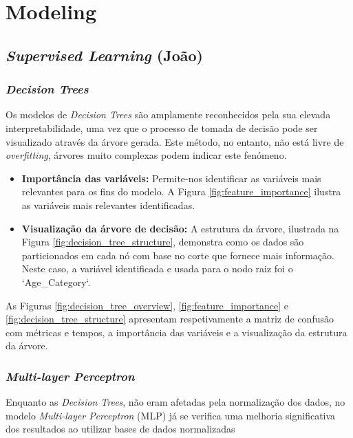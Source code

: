 \chapter{Modeling}
\label{chap4:modeling}


\section{\textit{Supervised Learning} (João)}
\label{chap4:super}

\subsection{\textit{Decision Trees}}
\label{chap4:decision_tree}

Os modelos de \textit{Decision Trees} são amplamente reconhecidos pela sua elevada interpretabilidade, uma vez que o processo de tomada de decisão pode ser visualizado através da árvore gerada. Este método, no entanto, não está livre de \textit{overfitting}, árvores muito complexas podem indicar este fenómeno.

\begin{itemize}
    \item \textbf{Importância das variáveis:} Permite-nos identificar as variáveis mais relevantes para os fins do modelo. A Figura \ref{fig:feature_importance} ilustra as variáveis mais relevantes identificadas.
    \item \textbf{Visualização da árvore de decisão:} A estrutura da árvore, ilustrada na Figura \ref{fig:decision_tree_structure}, demonstra como os dados são particionados em cada nó com base no corte que fornece mais informação. Neste caso, a variável identificada e usada para o nodo raiz foi o `Age\_Category`. 
\end{itemize}

As Figuras \ref{fig:decision_tree_overview}, \ref{fig:feature_importance} e \ref{fig:decision_tree_structure} apresentam respetivamente a matriz de confusão com métricas e tempos, a importância das variáveis e a visualização da estrutura da árvore.


\subsection{\textit{Multi-layer Perceptron}}
\label{chap4:percetrao}

Enquanto as \textit{Decision Trees}, não eram afetadas pela normalização dos dados, no modelo \textit{Multi-layer Perceptron} (MLP) já se verifica uma melhoria significativa dos resultados ao utilizar bases de dados normalizadas

